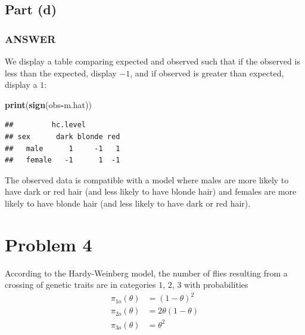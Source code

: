 \documentclass[
]{article}
\newenvironment{Shaded}{\begin{snugshade}}{\end{snugshade}}
\newcommand{\FunctionTok}[1]{\textcolor[rgb]{0.13,0.29,0.53}{\textbf{#1}}}
\newcommand{\NormalTok}[1]{#1}
\newcommand{\SpecialCharTok}[1]{\textcolor[rgb]{0.81,0.36,0.00}{\textbf{#1}}}
\begin{document}
\hypertarget{part-d-1}{%
\subsection{Part (d)}\label{part-d-1}}


\hypertarget{answer-16}{%
\subsubsection{ANSWER}\label{answer-16}}

We display a table comparing expected and observed such that if the
observed is less than the expected, display \(-1\), and if observed is
greater than expected, display a \(1\):

\begin{Shaded}
\begin{Highlighting}[]
\FunctionTok{print}\NormalTok{(}\FunctionTok{sign}\NormalTok{(obs}\SpecialCharTok{{-}}\NormalTok{m.hat))}
\end{Highlighting}
\end{Shaded}

\begin{verbatim}
##         hc.level
## sex      dark blonde red
##   male      1     -1   1
##   female   -1      1  -1
\end{verbatim}

The observed data is compatible with a model where males are more likely
to have dark or red hair (and less likely to have blonde hair) and
females are more likely to have blonde hair (and less likely to have
dark or red hair).

\hypertarget{problem-4}{%
\section{Problem 4}\label{problem-4}}

According to the Hardy-Weinberg model, the number of flies resulting
from a crossing of genetic traits are in categories \(1\), \(2\), \(3\)
with probabilities \begin{align*}
  \pi_{1 o}(\theta) &= (1-\theta)^2\\
  \pi_{2 o}(\theta) &= 2\theta(1-\theta)\\
  \pi_{3 o}(\theta) &= \theta^2
\end{align*}
\end{document}
